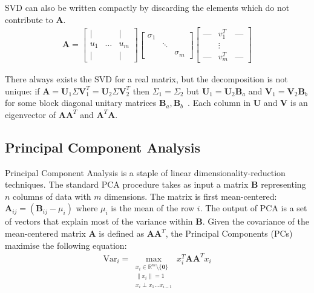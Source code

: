 SVD can also be written compactly by discarding the elements which do not
contribute to $\mathbf{A}$.
\begin{align}
\mathbf{A} = \begin{bmatrix} \mid & & \mid \\ u_1 & \ldots & u_m
\\ \mid & & \mid  \end{bmatrix} \begin{bmatrix} \sigma_1 &
        & \\ & \ddots & \\ & & \sigma_m \end{bmatrix} \begin{bmatrix} \text{---}
& v_1^T & \text{---} \\ & \vdots & \\ \text{---} & v_m^T & \text{---}
\end{bmatrix}
\end{align}

There always exists the SVD for a real matrix, but the decomposition is not
unique: if $\mathbf{A} = \mathbf{U}_1\Sigma\mathbf{V}_1^T =
\mathbf{U}_2\Sigma\mathbf{V}_2^T$ then $\Sigma_1 = \Sigma_2$ but $\mathbf{U}_1 =
\mathbf{U}_2\mathbf{B}_a$ and $\mathbf{V}_1 = \mathbf{V}_2\mathbf{B}_b$ for some
block diagonal unitary matrices $\mathbf{B}_a,
\mathbf{B}_b$~\cite{eftekhari2019moses, Strang2009}. Each column in
$\mathbf{U}$ and $\mathbf{V}$ is an eigenvector of $\mathbf{AA}^T$ and
$\mathbf{A}^T\mathbf{A}$.

\subsection{Principal Component Analysis}
Principal Component Analysis is a staple of linear dimensionality-reduction
techniques. The standard PCA procedure takes as input a matrix $\mathbf{B}$
representing $n$ columns of data with $m$ dimensions. The matrix is first
mean-centered: $\mathbf{A}_{ij} = (\mathbf{B}_{ij} - \mu_i)$ where $\mu_i$ is
the mean of the row $i$. The output of PCA is a set of vectors that explain most
of the variance within $\mathbf{B}$. Given the covariance of the mean-centered
matrix $\mathbf{A}$ is defined as $\mathbf{AA}^T$, the Principal Components (PCs)
maximise the following equation:
\begin{align}
\text{Var}_i = \max_{\substack{x_i \in \mathbb{R}^m \setminus \{\mathbf{0}\} \\
    \|x_i\|=1 \\ x_i \perp x_1 \dots x_{i-1}}} x_i^T \mathbf{A} \mathbf{A}^T x_i
\end{align}

